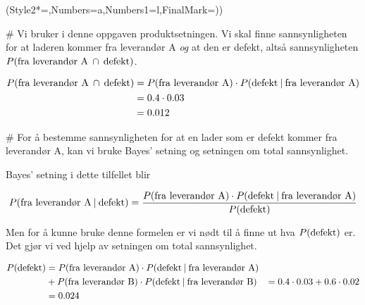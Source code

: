 \begin{easylist}[enumerate]
	\ListProperties(Style2*=,Numbers=a,Numbers1=l,FinalMark={)})
	
	
	# Vi bruker i denne oppgaven produktsetningen. Vi skal finne sannsynligheten for at laderen kommer fra leverandør A \textit{og} at den er defekt, altså sannsynligheten $P(\textnormal{fra leverandør A} \: \cap \: \textnormal{defekt})$.
	
	\begin{equation*}
		\begin{aligned}
			P(\textnormal{fra leverandør A} \: \cap \: \textnormal{defekt}) & = P(\textnormal{fra leverandør A}) \cdot P(\textnormal{defekt}  \: | \: \textnormal{fra leverandør A}) \\
			& = 0.4 \cdot 0.03 \\
			& = 0.012
		\end{aligned}
	\end{equation*}
	
	
	# For å bestemme sannsynligheten for at en lader som er defekt kommer fra leverandør A, kan vi bruke Bayes' setning og setningen om total sannsynlighet. 
	
	Bayes' setning i dette tilfellet blir 
	
	\begin{equation*}
		\begin{aligned}
			P(\textnormal{fra leverandør A} \: | \:  \textnormal{defekt}) &= \frac{P(\textnormal{fra leverandør A}) \cdot P(\textnormal{defekt} \: | \: \textnormal{fra leverandør A})}{P(\textnormal{defekt})} \\
		\end{aligned}
	\end{equation*}

	Men for å kunne bruke denne formelen er vi nødt til å finne ut hva $P(\textnormal{defekt})$ er. Det gjør vi ved hjelp av setningen om total sannsynlighet.
	
	\begin{equation*}
		\begin{aligned}
			P(\textnormal{defekt}) & = P(\textnormal{fra leverandør A}) \cdot P(\textnormal{defekt} \: | \: \textnormal{fra leverandør A}) \\
			& + P(\textnormal{fra leverandør B}) \cdot P(\textnormal{defekt} \: | \: \textnormal{fra leverandør B})
			& = 0.4 \cdot 0.03 + 0.6 \cdot 0.02 \\
			& = 0.024
		\end{aligned}
	\end{equation*}
	

\end{easylist}
